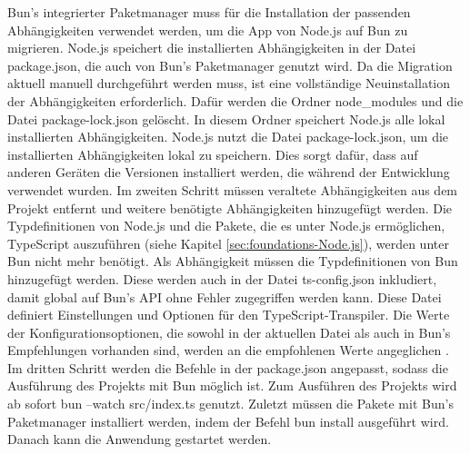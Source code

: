\noindent
Bun's integrierter Paketmanager muss für die Installation der passenden Abhängigkeiten verwendet werden, um die App von Node.js auf Bun zu migrieren. Node.js speichert die installierten Abhängigkeiten in der Datei \glq package.json\grq{}, die auch von Bun's Paketmanager genutzt wird. Da die Migration aktuell manuell durchgeführt werden muss, ist eine vollständige Neuinstallation der Abhängigkeiten erforderlich. Dafür werden die Ordner \glq node\_modules\grq{} und die Datei \glq package-lock.json\grq{} gelöscht. In diesem Ordner speichert Node.js alle lokal installierten Abhängigkeiten. Node.js nutzt die Datei \glq package-lock.json\grq{}, um die installierten Abhängigkeiten lokal zu speichern. Dies sorgt dafür, dass auf anderen Geräten die Versionen installiert werden, die während der Entwicklung verwendet wurden. \newline
Im zweiten Schritt müssen veraltete Abhängigkeiten aus dem Projekt entfernt und weitere benötigte Abhängigkeiten hinzugefügt werden. Die Typdefinitionen von Node.js und die Pakete, die es unter Node.js ermöglichen, TypeScript auszuführen (siehe Kapitel \ref{sec:foundations-Node.js}), werden unter Bun nicht mehr benötigt. Als Abhängigkeit müssen die Typdefinitionen von Bun hinzugefügt werden. Diese werden auch in der Datei \glq ts-config.json\grq{} inkludiert, damit global auf Bun's API ohne Fehler zugegriffen werden kann. Diese Datei definiert Einstellungen und Optionen für den TypeScript-Transpiler. Die Werte der Konfigurationsoptionen, die sowohl in der aktuellen Datei als auch in Bun's Empfehlungen vorhanden sind, werden an die empfohlenen Werte angeglichen \cite{OvenSh.2023d}.\newline 
Im dritten Schritt werden die Befehle in der \glq package.json\grq{} angepasst, sodass die Ausführung des Projekts mit Bun möglich ist. Zum Ausführen des Projekts wird ab sofort \glq bun --watch src/index.ts\grq{} genutzt. Zuletzt müssen die Pakete mit Bun's Paketmanager installiert werden, indem der Befehl \glq bun install\grq{} ausgeführt wird. Danach kann die Anwendung gestartet werden.\\


